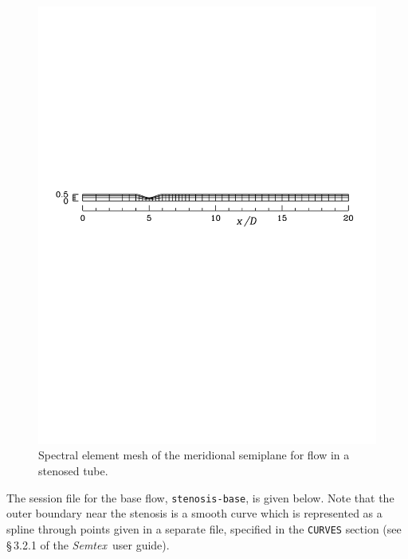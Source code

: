 \documentclass[11pt,a4paper]{report}
\newcommand{\Semtex}{\emph{Semtex}}
\begin{document}
\begin{figure}
\begin{center}
\includegraphics[width=\textwidth]{stenosismesh}
\end{center}
\caption{Spectral element mesh of the meridional semiplane for flow in
  a stenosed tube.}
\label{fig.sten}
\end{figure}

The session file for the base flow, \verb+stenosis-base+, is given
below. Note that the outer boundary near the stenosis is a smooth
curve which is represented as a spline through points given in a
separate file, specified in the \verb+CURVES+ section (see \S\,3.2.1
of the \Semtex\ user guide).
\end{document}
